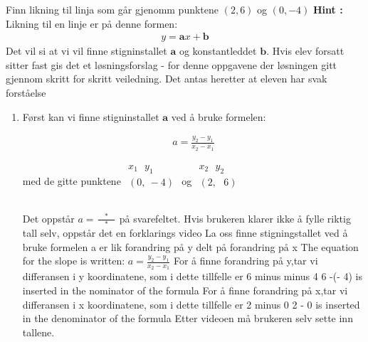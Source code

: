 \documentclass[12pt,twoside,onecolumn]{article}
\begin{document}
\begin{Exercise}
Finn likning til linja som går gjenomm punktene $(2,6)$  og  $(0,-4 )$
\newline\newline
\textbf{Hint :}\newline 
Likning til en linje er på denne formen:
\begin{align}
y=\mathbf{a}x+ \mathbf{b}
\end{align}
Det vil si at vi vil finne stigninstallet $\mathbf{a}$ og konstantleddet $\mathbf{b}$.
\newline\newline
{\color{Maroon}Hvis elev forsatt sitter fast gis det et løsningsforslag -  for denne oppgavene der løsningen gitt gjennom skritt for skritt veiledning. Det antas heretter at eleven har svak forståelse}

\begin{enumerate}
\item Først kan vi finne stigninstallet $\mathbf{a}$  ved å bruke formelen:

\begin{align}
a =  \frac{y_2 - y_1}{x_2 - x_1}
\end{align}

med de gitte punktene
$
\begin{matrix}
  x_1\:\:\: y_1 \\ 
 (0,\:-4) \\
\phantom{0}
\end{matrix}
$ og $
\begin{matrix}
  x_2\:\:\: y_2 \\ 
 (2,\:\:\:6)  \\
\phantom{0}
\end{matrix}
$ 

{\color{Maroon} Det oppstår $a=\frac{\:\:\:\:*\:\:\:\:}{\:\:\:\:*\:\:\:\:}$ på svarefeltet.
Hvis brukeren klarer ikke å fylle riktig tall selv, oppstår det en forklarings video}
\newline
\newline
{\color{gray} La oss finne stigningstallet ved å bruke formelen a er lik forandring på y delt på forandring på x } \newline
{\color{PineGreen} The equation for the slope is written: $a =  \frac{y_2 - y_1}{x_2 - x_1}$ } \newline
{\color{gray}  For å finne forandring på y,tar vi differansen i y koordinatene, som i dette tillfelle er 6 minus minus 4 } \newline
{\color{PineGreen}  6 -(- 4) is inserted in the nominator of the formula} \newline
{\color{gray}  For å finne forandring på x,tar vi differansen i x koordinatene, som i dette tillfelle er 2 minus 0 } \newline
{\color{PineGreen} 2 - 0 is inserted in the denominator of the formula  } \newline
{\color{Maroon}  Etter videoen må brukeren selv sette inn tallene.}


\end{enumerate}
\end{Exercise}
\end{document}
